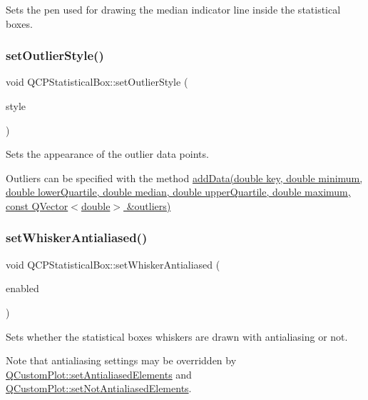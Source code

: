 Sets the pen used for drawing the median indicator line inside the statistical boxes. \mbox{\label{class_q_c_p_statistical_box_ad5241943422eb8e58360a97e99ad6aa7}} 
\subsubsection{\texorpdfstring{set\+Outlier\+Style()}{setOutlierStyle()}}
{\footnotesize\ttfamily void Q\+C\+P\+Statistical\+Box\+::set\+Outlier\+Style (\begin{DoxyParamCaption}\item[{const \hyperlink{class_q_c_p_scatter_style}{Q\+C\+P\+Scatter\+Style} \&}]{style }\end{DoxyParamCaption})}

Sets the appearance of the outlier data points.

Outliers can be specified with the method \hyperlink{class_q_c_p_statistical_box_a026f2790b530d6f29312254ecb1e7c1e}{add\+Data(double key, double minimum, double lower\+Quartile, double median, double upper\+Quartile, double maximum, const Q\+Vector$<$double$>$ \&outliers)} \mbox{\label{class_q_c_p_statistical_box_a61bcd458fba002f72304d11319051843}} 
\subsubsection{\texorpdfstring{set\+Whisker\+Antialiased()}{setWhiskerAntialiased()}}
{\footnotesize\ttfamily void Q\+C\+P\+Statistical\+Box\+::set\+Whisker\+Antialiased (\begin{DoxyParamCaption}\item[{bool}]{enabled }\end{DoxyParamCaption})}

Sets whether the statistical boxes whiskers are drawn with antialiasing or not.

Note that antialiasing settings may be overridden by \hyperlink{class_q_custom_plot_af6f91e5eab1be85f67c556e98c3745e8}{Q\+Custom\+Plot\+::set\+Antialiased\+Elements} and \hyperlink{class_q_custom_plot_ae10d685b5eabea2999fb8775ca173c24}{Q\+Custom\+Plot\+::set\+Not\+Antialiased\+Elements}. \mbox{\label{class_q_c_p_statistical_box_aa8d3e503897788e1abf68dc74b5f147f}} 
